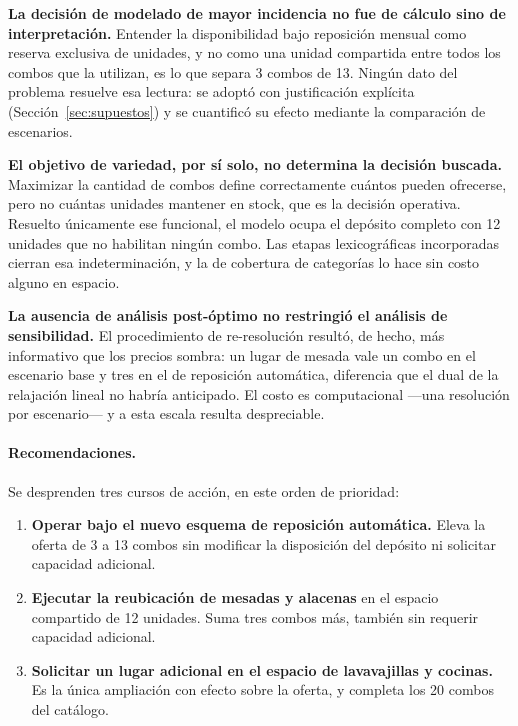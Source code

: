 \documentclass[10pt,a4paper]{article}
\begin{document}
\textbf{La decisión de modelado de mayor incidencia no fue de cálculo sino de
interpretación.} Entender la disponibilidad bajo reposición mensual como reserva
exclusiva de unidades, y no como una unidad compartida entre todos los combos
que la utilizan, es lo que separa 3 combos de 13. Ningún dato del problema
resuelve esa lectura: se adoptó con justificación explícita
(Sección~\ref{sec:supuestos}) y se cuantificó su efecto mediante la comparación
de escenarios.

\textbf{El objetivo de variedad, por sí solo, no determina la decisión
buscada.} Maximizar la cantidad de combos define correctamente cuántos pueden
ofrecerse, pero no cuántas unidades mantener en stock, que es la decisión
operativa. Resuelto únicamente ese funcional, el modelo ocupa el depósito
completo con 12 unidades que no habilitan ningún combo. Las etapas
lexicográficas incorporadas cierran esa indeterminación, y la de cobertura de
categorías lo hace sin costo alguno en espacio.

\textbf{La ausencia de análisis post-óptimo no restringió el análisis de
sensibilidad.} El procedimiento de re-resolución resultó, de hecho, más
informativo que los precios sombra: un lugar de mesada vale un combo en el
escenario base y tres en el de reposición automática, diferencia que el dual de
la relajación lineal no habría anticipado. El costo es computacional —una
resolución por escenario— y a esta escala resulta despreciable.

\paragraph{Recomendaciones.} Se desprenden tres cursos de acción, en este orden
de prioridad:

\begin{enumerate}
  \item \textbf{Operar bajo el nuevo esquema de reposición automática.} Eleva la
  oferta de 3 a 13 combos sin modificar la disposición del depósito ni solicitar
  capacidad adicional.
  \item \textbf{Ejecutar la reubicación de mesadas y alacenas} en el espacio
  compartido de 12 unidades. Suma tres combos más, también sin requerir
  capacidad adicional.
  \item \textbf{Solicitar un lugar adicional en el espacio de lavavajillas y
  cocinas.} Es la única ampliación con efecto sobre la oferta, y completa los 20
  combos del catálogo.
\end{enumerate}
\end{document}
